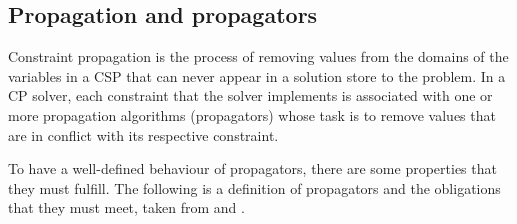 \documentclass[a4paper,11pt]{article}
\numberwithin{equation}{section}
\begin{document}
\subsection{Propagation and propagators}

Constraint propagation is the process of removing values from the domains
of the variables in a CSP that can never appear in a solution store to the 
problem. In a CP solver, each constraint that the solver implements is 
associated with 
one or more propagation algorithms (propagators) whose task is to remove
values that are in conflict with its respective constraint.

To have a well-defined behaviour of propagators, there are some properties that
they must fulfill. The following is a definition of propagators and the obligations
that they must meet, taken from \cite{SchulteCarlsson:FDsys} and \cite{Gecode:MPG}.
\end{document}
